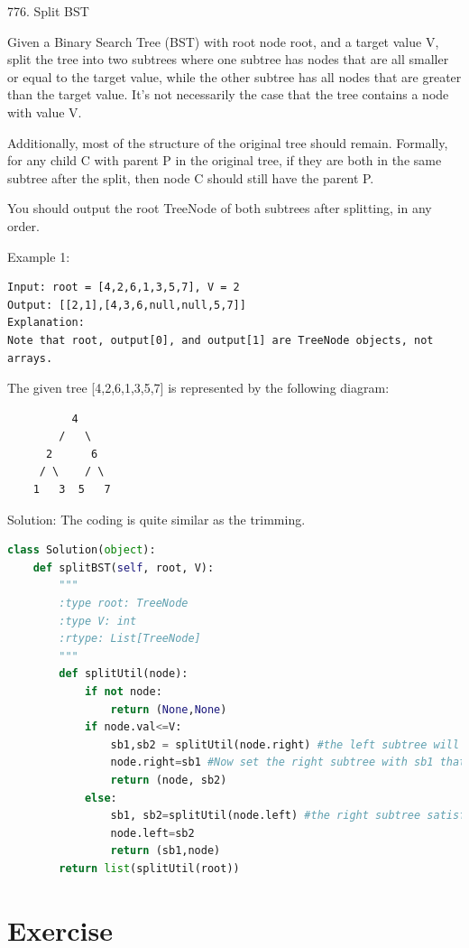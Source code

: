 \documentclass[../main.tex]{subfiles}
\begin{document}
776. Split BST

Given a Binary Search Tree (BST) with root node root, and a target value V, split the tree into two subtrees where one subtree has nodes that are all smaller or equal to the target value, while the other subtree has all nodes that are greater than the target value. It's not necessarily the case that the tree contains a node with value V.

Additionally, most of the structure of the original tree should remain. Formally, for any child C with parent P in the original tree, if they are both in the same subtree after the split, then node C should still have the parent P.

You should output the root TreeNode of both subtrees after splitting, in any order.

Example 1:
\begin{lstlisting}
Input: root = [4,2,6,1,3,5,7], V = 2
Output: [[2,1],[4,3,6,null,null,5,7]]
Explanation:
Note that root, output[0], and output[1] are TreeNode objects, not arrays.
\end{lstlisting}

The given tree [4,2,6,1,3,5,7] is represented by the following diagram:
\begin{lstlisting}
          4
        /   \
      2      6
     / \    / \
    1   3  5   7
\end{lstlisting}

Solution: The coding is quite similar as the trimming.
\begin{lstlisting}[language = Python]
class Solution(object):
    def splitBST(self, root, V):
        """
        :type root: TreeNode
        :type V: int
        :rtype: List[TreeNode]
        """
        def splitUtil(node):
            if not node:
                return (None,None)
            if node.val<=V:
                sb1,sb2 = splitUtil(node.right) #the left subtree will satisfy the condition, split the right subtree
                node.right=sb1 #Now set the right subtree with sb1 that
                return (node, sb2)
            else:
                sb1, sb2=splitUtil(node.left) #the right subtree satisfy the condition, split the left subtree
                node.left=sb2
                return (sb1,node)
        return list(splitUtil(root))
\end{lstlisting}

\section{Exercise}
\end{document}
